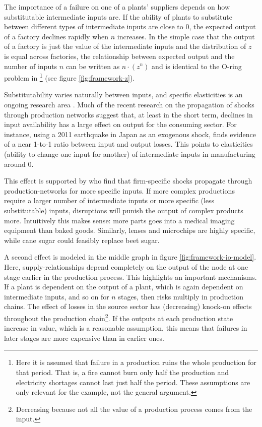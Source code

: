 \documentclass[11pt]{article}
\begin{document}
The importance of a failure on one of a plants' suppliers depends on how substitutable intermediate inputs are. If the ability of plants to substitute between different types of intermediate inputs are close to 0, the expected output of a factory declines rapidly when \(n\) increases. In the simple case that the output of a factory is just the value of the intermediate inputs and the distribution of \(z\) is equal across factories, the relationship between expected output and the number of inputs \(n\) can be written as \(n\cdot(z^{n})\) and is identical to the O-ring problem in \cite{kremer_o-ring_1993}\footnote{Here it is assumed that failure in a production ruins the whole production for that period. That is, a fire cannot burn only half the production and electricity shortages cannot last just half the period. These assumptions are only relevant for the example, not the general argument.} (see figure \ref{fig:framework-z}).

Substitutability varies naturally between inputs, and specific elasticities is an ongoing research area \citep{brummitt_contagious_2017,carvalho_micro_2014}. Much of the recent research on the propagation of shocks through production networks suggest that, at least in the short term, declines in input availability has a large effect on output for the consuming sector. For instance, using a 2011 earthquake in Japan as an exogenous shock, \cite{boehm_input_2019-1} finds evidence of a near 1-to-1 ratio between input and output losses. This points to elasticities (ability to change one input for another) of intermediate inputs in manufacturing around 0.

This effect is supported by \cite{barrot_input_2016} who find that firm-specific shocks propagate through production-networks for more specific inputs. If more complex productions require a larger number of intermediate inputs or more specific (less substitutable) inputs, disruptions will punish the output of complex products more. Intuitively this makes sense: more parts goes into a medical imaging equipment than baked goods. Similarly, lenses and microchips are highly specific, while cane sugar could feasibly replace beet sugar.

A second effect is modeled in the middle graph in figure \ref{fig:framework-io-model}. Here, supply-relationships depend completely on the output of the node at one stage earlier in the production process. This highlights an important mechanisms. If a plant is dependent on the output of a plant, which is again dependent on intermediate inputs, and so on for \(n\) stages, then risks multiply in production chains. The effect of losses in the source sector has (decreasing) knock-on effects throughout the production chain\footnote{Decreasing because not all the value of a production process comes from the input.}. If the outputs at each production state increase in value, which is a reasonable assumption, this means that failures in later stages are more expensive than in earlier ones.
\end{document}
